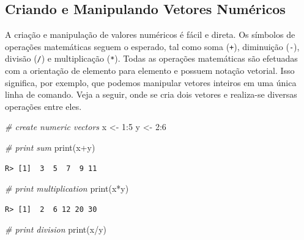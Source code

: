 \documentclass[
  11pt,
]{book}
\newenvironment{Shaded}{\begin{snugshade}}{\end{snugshade}}
\newcommand{\CommentTok}[1]{\textcolor[rgb]{0.37,0.37,0.37}{\textit{#1}}}
\newcommand{\DecValTok}[1]{\textcolor[rgb]{0.06,0.06,0.06}{#1}}
\newcommand{\FunctionTok}[1]{\textcolor[rgb]{0,0,0}{#1}}
\newcommand{\NormalTok}[1]{#1}
\newcommand{\OtherTok}[1]{\textcolor[rgb]{0.37,0.37,0.37}{#1}}
\newcommand{\SpecialCharTok}[1]{\textcolor[rgb]{0,0,0}{#1}}
\begin{document}
\hypertarget{criando-e-manipulando-vetores-numuxe9ricos}{%
\subsection{Criando e Manipulando Vetores Numéricos}\label{criando-e-manipulando-vetores-numuxe9ricos}}

A criação e manipulação de valores numéricos é fácil e direta. Os símbolos de operações matemáticas seguem o esperado, tal como soma (\texttt{+}), diminuição (\texttt{-}), divisão (\texttt{/}) e multiplicação (\texttt{*}). Todas as operações matemáticas são efetuadas com a orientação de elemento para elemento e possuem notação vetorial. Isso significa, por exemplo, que podemos manipular vetores inteiros em uma única linha de comando. Veja a seguir, onde se cria dois vetores e realiza-se diversas operações entre eles.

\begin{Shaded}
\begin{Highlighting}[]
\CommentTok{\# create numeric vectors}
\NormalTok{x }\OtherTok{\textless{}{-}} \DecValTok{1}\SpecialCharTok{:}\DecValTok{5}
\NormalTok{y }\OtherTok{\textless{}{-}} \DecValTok{2}\SpecialCharTok{:}\DecValTok{6}

\CommentTok{\# print sum}
\FunctionTok{print}\NormalTok{(x}\SpecialCharTok{+}\NormalTok{y)}
\end{Highlighting}
\end{Shaded}

\begin{verbatim}
R> [1]  3  5  7  9 11
\end{verbatim}

\begin{Shaded}
\begin{Highlighting}[]
\CommentTok{\# print multiplication}
\FunctionTok{print}\NormalTok{(x}\SpecialCharTok{*}\NormalTok{y)}
\end{Highlighting}
\end{Shaded}

\begin{verbatim}
R> [1]  2  6 12 20 30
\end{verbatim}

\begin{Shaded}
\begin{Highlighting}[]
\CommentTok{\# print division}
\FunctionTok{print}\NormalTok{(x}\SpecialCharTok{/}\NormalTok{y)}
\end{Highlighting}
\end{Shaded}
\end{document}
